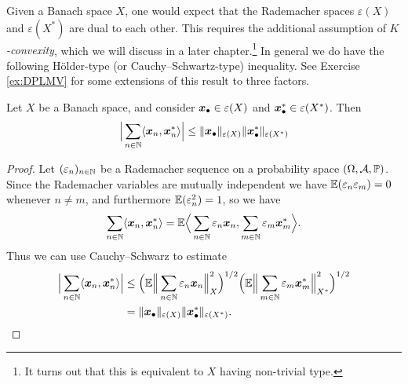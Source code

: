 Given a Banach space $X$, one would expect that the Rademacher spaces $\varepsilon(X)$ and $\varepsilon(X^{*})$ are dual to each other.
This requires the additional assumption of \emph{$K$-convexity}, which we will discuss in a later chapter.\footnote{It turns out that this is equivalent to $X$ having non-trivial type.}
In general we do have the following H\"older-type (or Cauchy--Schwartz-type) inequality.
See Exercise \ref{ex:DPLMV} for some extensions of this result to three factors.

\begin{prop}\label{prop:rademacher-CS}
  Let $X$ be a Banach space, and consider $\bm{x}_{\bullet} \in \varepsilon(X)$ and $\bm{x}_{\bullet}^{*} \in \varepsilon(X^{*})$.
  Then
  \begin{equation*}
    \Big| \sum_{n \in \mathbb{N}} \langle \bm{x}_{n}, \bm{x}_{n}^{*} \rangle \Big| \leq \|\bm{x}_{\bullet}\|_{\varepsilon(X)} \|\bm{x}_{\bullet}^{*}\|_{\varepsilon(X^{*})} 
  \end{equation*}
\end{prop}

\begin{proof}
  Let $(\varepsilon_{n})_{n \in \mathbb{N}}$ be a Rademacher sequence on a probability space $(\Omega,\mathcal{A},\mathbb{P})$.
  Since the Rademacher variables are mutually independent we have $\mathbb{E}(\varepsilon_{n} \varepsilon_m) = 0$ whenever $n \neq m$, and furthermore $\mathbb{E}(\varepsilon_{n}^{2}) = 1$, so we have
  \begin{equation*}
    \sum_{n \in \mathbb{N}} \langle \bm{x}_{n}, \bm{x}_{n}^{*} \rangle
    = \mathbb{E} \Big\langle \sum_{n \in \mathbb{N}} \varepsilon_{n} \bm{x}_{n}, \sum_{m \in \mathbb{N}} \varepsilon_{m} \bm{x}_{m}^{*} \Big\rangle.
  \end{equation*}
  Thus we can use Cauchy--Schwarz to estimate
    \begin{equation*}
      \begin{aligned}
        \Big|\sum_{n \in \mathbb{N}} \langle \bm{x}_{n}, \bm{x}_{n}^{*} \rangle \Big|
        &\leq \Big( \mathbb{E} \Big\| \sum_{n \in \mathbb{N}} \varepsilon_{n} \bm{x}_{n} \Big\|_{X}^{2} \Big)^{1/2} 
        \Big( \mathbb{E} \Big\| \sum_{m \in \mathbb{N}} \varepsilon_{m} \bm{x}_{m}^{*} \Big\|_{X^{*}}^{2} \Big)^{1/2} \\
        & = \|\bm{x}_{\bullet}\|_{\varepsilon(X)} \|\bm{x}_{\bullet}^{*}\|_{\varepsilon(X^{*})} .
      \end{aligned}
    \end{equation*}
\end{proof}







